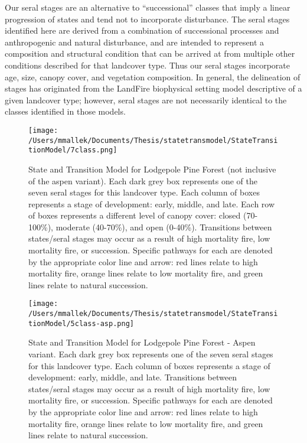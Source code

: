 Our seral stages are an alternative to ``successional'' classes that imply a linear progression of states and tend not to incorporate disturbance. The seral stages identified here are derived from a combination of successional processes and anthropogenic and natural disturbance, and are intended to represent a composition and structural condition that can be arrived at from multiple other conditions described for that landcover type. Thus our seral stages incorporate age, size, canopy cover, and vegetation composition. In general, the delineation of stages has originated from the LandFire biophysical setting model descriptive of a given landcover type; however, seral stages are not necessarily identical to the classes identified in those models.


\begin{figure}[htbp]
\centering
\texttt{[image: /Users/mmallek/Documents/Thesis/statetransmodel/StateTransitionModel/7class.png]}
\caption{State and Transition Model for Lodgepole Pine Forest (not inclusive of the aspen variant). Each dark grey box represents one of the seven seral stages for this landcover type. Each column of boxes represents a stage of development: early, middle, and late. Each row of boxes represents a different level of canopy cover: closed (70-100\%), moderate (40-70\%), and open (0-40\%). Transitions between states/seral stages may occur as a result of high mortality fire, low mortality fire, or succession. Specific pathways for each are denoted by the appropriate color line and arrow: red lines relate to high mortality fire, orange lines relate to low mortality fire, and green lines relate to natural succession.} 
\label{transmodel_lpn}
\end{figure}

\begin{figure}[htbp]
\centering
\texttt{[image: /Users/mmallek/Documents/Thesis/statetransmodel/StateTransitionModel/5class-asp.png]}
\caption{State and Transition Model for Lodgepole Pine Forest - Aspen variant. Each dark grey box represents one of the seven seral stages for this landcover type. Each column of boxes represents a stage of development: early, middle, and late. Transitions between states/seral stages may occur as a result of high mortality fire, low mortality fire, or succession. Specific pathways for each are denoted by the appropriate color line and arrow: red lines relate to high mortality fire, orange lines relate to low mortality fire, and green lines relate to natural succession.} 
\label{transmodel_lpn-asp}
\end{figure}


